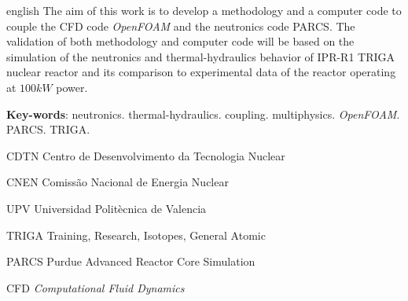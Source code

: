 \documentclass[12pt,openright,twoside,a4paper,english,french,spanish,brazil]{abntex2}
\begin{document}
\begin{resumo}[Abstract]
 \begin{otherlanguage*}{english}
   The aim of this work is to develop a methodology and a computer code to couple the CFD 
code \textit{OpenFOAM} and the neutronics code PARCS. The validation of both methodology and 
computer code will be based on the simulation of the neutronics and thermal-hydraulics behavior 
of IPR-R1 TRIGA nuclear reactor and its comparison to experimental data of the reactor operating 
at $100 kW$ power.

   \vspace{\onelineskip}
% 
   \noindent 
   \textbf{Key-words}: neutronics. thermal-hydraulics. coupling. multiphysics. \textit{OpenFOAM}. PARCS. TRIGA.
 \end{otherlanguage*}
\end{resumo}

% 
% 

%  
% 

\listoffigures*
\cleardoublepage

\listoftables*
\cleardoublepage

\begin{siglas}
  \item[CDTN] Centro de Desenvolvimento da Tecnologia Nuclear
  \item[CNEN] Comissão Nacional de Energia Nuclear
  \item[UPV] Universidad Politècnica de Valencia
  \item[TRIGA] Training, Research, Isotopes, General Atomic
  \item[PARCS] Purdue Advanced Reactor Core Simulation
  \item[CFD] \textit{Computational Fluid Dynamics}
\end{siglas}
\end{document}

